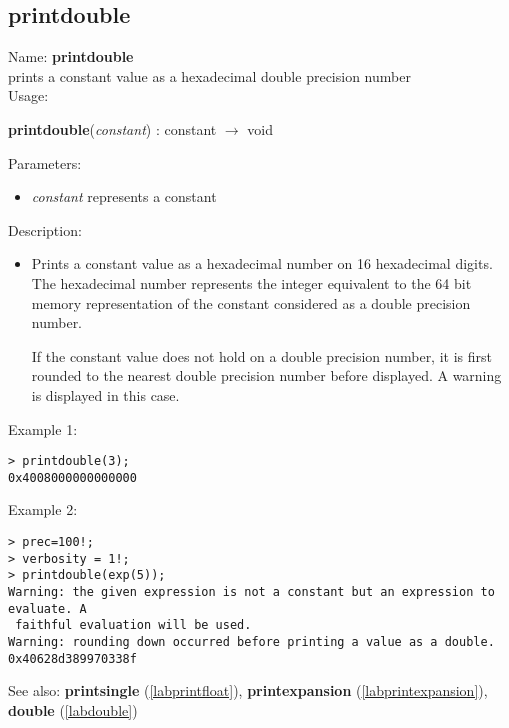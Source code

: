 \subsection{printdouble}
\label{labprinthexa}
\noindent Name: \textbf{printdouble}\\
prints a constant value as a hexadecimal double precision number\\
\noindent Usage: 
\begin{center}
\textbf{printdouble}(\emph{constant}) : \textsf{constant} $\rightarrow$ \textsf{void}\\
\end{center}
Parameters: 
\begin{itemize}
\item \emph{constant} represents a constant
\end{itemize}
\noindent Description: \begin{itemize}

\item Prints a constant value as a hexadecimal number on 16 hexadecimal
   digits. The hexadecimal number represents the integer equivalent to
   the 64 bit memory representation of the constant considered as a
   double precision number.
    
   If the constant value does not hold on a double precision number, it
   is first rounded to the nearest double precision number before
   displayed. A warning is displayed in this case.
\end{itemize}
\noindent Example 1: 
\begin{center}\begin{minipage}{15cm}\begin{Verbatim}[frame=single]
> printdouble(3);
0x4008000000000000
\end{Verbatim}
\end{minipage}\end{center}
\noindent Example 2: 
\begin{center}\begin{minipage}{15cm}\begin{Verbatim}[frame=single]
> prec=100!;
> verbosity = 1!;
> printdouble(exp(5));
Warning: the given expression is not a constant but an expression to evaluate. A
 faithful evaluation will be used.
Warning: rounding down occurred before printing a value as a double.
0x40628d389970338f
\end{Verbatim}
\end{minipage}\end{center}
See also: \textbf{printsingle} (\ref{labprintfloat}), \textbf{printexpansion} (\ref{labprintexpansion}), \textbf{double} (\ref{labdouble})
